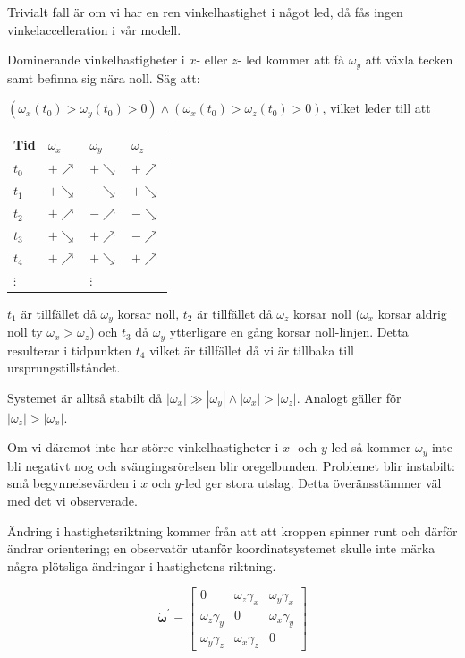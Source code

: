 \documentclass[12pt,a4paper]{article}
\begin{document}
		Trivialt fall är om vi har en ren vinkelhastighet i något led, då fås ingen
		vinkelaccelleration i vår modell.
		
		Dominerande vinkelhastigheter i $x$- eller $z$- led kommer att få $\dot{\omega}_y$
		att växla tecken samt befinna sig nära noll. Säg att:
		
		$(\omega_x(t_0) > \omega_y(t_0) > 0) \land (\omega_x(t_0) > \omega_z(t_0) > 0)$, vilket leder till att
		
		\begin{center}
		\begin{tabular}{l|lll}
			Tid & $\omega_x$ & $\omega_y$ & $\omega_z$  \\
			\hline
			$t_0$ & $+\nearrow$ & $+\searrow$ & $+\nearrow$ \\
			$t_1$ & $+\searrow$ & $-\searrow$ & $+\searrow$ \\
			$t_2$ & $+\nearrow$ & $-\nearrow$ & $-\searrow$ \\
			$t_3$ & $+\searrow$ & $+\nearrow$ & $-\nearrow$ \\
			\hline
			$t_4$ & $+\nearrow$ & $+\searrow$ & $+\nearrow$ \\
			$\vdots$ & & $\vdots$ &
		\end{tabular}
	\end{center}
		
		$t_1$ är tillfället då $\omega_y$ korsar noll, $t_2$ är tillfället då $\omega_z$ korsar
		noll ($\omega_x$ korsar aldrig noll ty $\omega_x > \omega_z$) och $t_3$ då $\omega_y$
		ytterligare en gång korsar noll-linjen. Detta resulterar i tidpunkten $t_4$ vilket är
		tillfället då vi är tillbaka till ursprungstillståndet. 
		
		Systemet är alltså stabilt då $|\omega_x| \gg |\omega_y| \land |\omega_x| > |\omega_z|$.
		Analogt gäller för $|\omega_z| > |\omega_x|$.
		
		Om vi däremot inte har större
		vinkelhastigheter i $x$- och $y$-led så kommer $\dot{\omega_y}$ inte bli negativt
		nog och svängingsrörelsen blir oregelbunden. Problemet blir instabilt: små
		begynnelsevärden i $x$ och $y$-led ger stora utslag. Detta överänsstämmer väl med
		det vi observerade.
		
		Ändring i hastighetsriktning kommer från att att kroppen spinner runt och därför
		ändrar orientering; en observatör utanför koordinatsystemet skulle inte märka
		några plötsliga ändringar i hastighetens riktning.
		
		\begin{equation}
			\dot{\boldsymbol{\omega}}^{\prime} = \begin{bmatrix}
				0 & \omega_z \gamma_x & \omega_y \gamma_x \\
				\omega_z \gamma_y & 0 & \omega_x \gamma_y \\
				\omega_y \gamma_z & \omega_x \gamma_z & 0
			\end{bmatrix}
			\label{jacobian}
		\end{equation}
		
\end{document}
